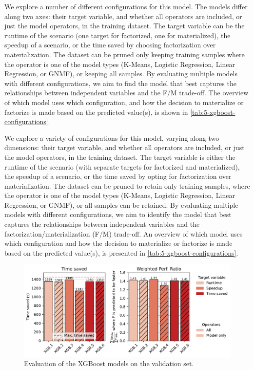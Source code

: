 We explore a number of different configurations for this model. The models differ along two axes: their target variable, and whether all operators are included, or just the model operators, in the training dataset. The target variable can be the runtime of the scenario (one target for factorized, one for materialized), the speedup of a scenario, or the time saved by choosing factorization over materialization. The dataset can be pruned only keeping training samples where the operator is one of the model types (K-Means, Logistic Regression, Linear Regression, or GNMF), or keeping all samples. By evaluating multiple models with different configurations, we aim to find the model that best captures the relationships between independent variables and the F/M trade-off. The overview of which model uses which configuration, and how the decision to materialize or factorize is made based on the predicted value(s), is shown in \autoref{tab:5-xgboost-configurations}.

We explore a variety of configurations for this model, varying along two dimensions: their target variable, and whether all operators are included, or just the model operators, in the training dataset. The target variable is either the runtime of the scenario (with separate targets for factorized and materialized), the speedup of a scenario, or the time saved by opting for factorization over materialization. The dataset can be pruned to retain only training samples, where the operator is one of the model types (K-Means, Logistic Regression, Linear Regression, or GNMF), or all samples can be retained. By evaluating multiple models with different configurations, we aim to identify the model that best captures the relationships between independent variables and the factorization/materialization (F/M) trade-off. An overview of which model uses which configuration and how the decision to materialize or factorize is made based on the predicted value(s), is presented in \autoref{tab:5-xgboost-configurations}.

\begin{figure}[ht]
    \centering
    \includegraphics[width=\linewidth]{chapters/05_cost_estimation/figures/xgb-models-compare.pdf}
    \caption[XGBoost Estimator Comparison]{Evaluation of the XGBoost models on the validation set.}
    \label{fig:5-xgboost-evaluation}
\end{figure}

